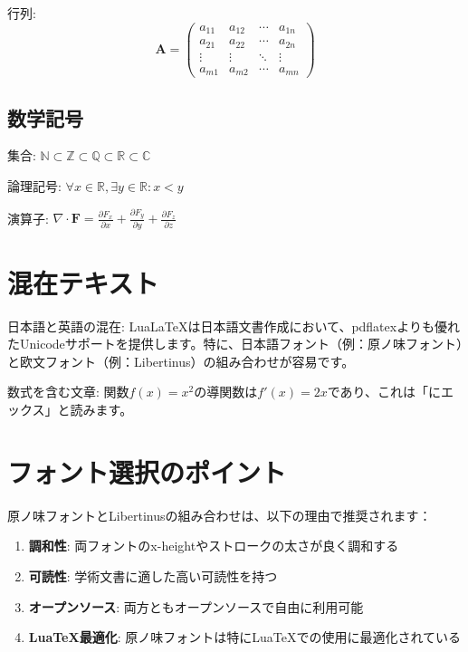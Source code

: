 \documentclass[a4paper,12pt]{ltjsarticle}
\begin{document}
行列:
\begin{equation}
    \mathbf{A} = \begin{pmatrix}
        a_{11} & a_{12} & \cdots & a_{1n} \\
        a_{21} & a_{22} & \cdots & a_{2n} \\
        \vdots & \vdots & \ddots & \vdots \\
        a_{m1} & a_{m2} & \cdots & a_{mn}
    \end{pmatrix}
\end{equation}

\subsection{数学記号}

集合: $\mathbb{N} \subset \mathbb{Z} \subset \mathbb{Q} \subset \mathbb{R} \subset \mathbb{C}$

論理記号: $\forall x \in \mathbb{R}, \exists y \in \mathbb{R} : x < y$

演算子: $\nabla \cdot \mathbf{F} = \frac{\partial F_x}{\partial x} + \frac{\partial F_y}{\partial y} + \frac{\partial F_z}{\partial z}$

\section{混在テキスト}

日本語と英語の混在: Lua\LaTeX{}は日本語文書作成において、pdflatexよりも優れたUnicodeサポートを提供します。特に、日本語フォント（例：原ノ味フォント）と欧文フォント（例：Libertinus）の組み合わせが容易です。

数式を含む文章: 関数$f(x) = x^2$の導関数は$f'(x) = 2x$であり、これは「にエックス」と読みます。

\section{フォント選択のポイント}

原ノ味フォントとLibertinusの組み合わせは、以下の理由で推奨されます：

\begin{enumerate}
    \item \textbf{調和性}: 両フォントのx-heightやストロークの太さが良く調和する
    \item \textbf{可読性}: 学術文書に適した高い可読性を持つ
    \item \textbf{オープンソース}: 両方ともオープンソースで自由に利用可能
    \item \textbf{Lua\TeX{}最適化}: 原ノ味フォントは特にLua\TeX{}での使用に最適化されている
\end{enumerate}
\end{document}
